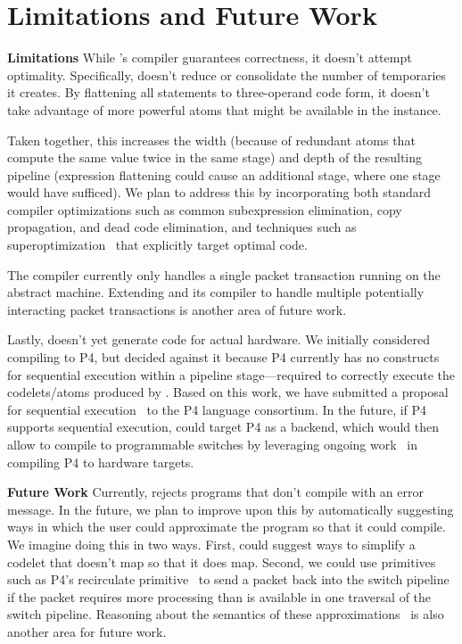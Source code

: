 \section{Limitations and Future Work}
\label{s:limitations}

\textbf{Limitations}
While \pktlanguage's compiler guarantees correctness, it doesn't attempt
optimality.  Specifically, \pktlanguage doesn't reduce or consolidate the
number of temporaries it creates. By flattening all statements to three-operand
code form, it doesn't take advantage of more powerful atoms that might be
available in the \absmachine instance.

Taken together, this increases the width (because of redundant atoms that
compute the same value twice in the same stage) and depth of the resulting
pipeline (expression flattening could cause an additional stage, where one
stage would have sufficed). We plan to address this by incorporating both
standard compiler optimizations such as common subexpression elimination, copy
propagation, and dead code elimination, and techniques such as
superoptimization~\cite{stoke, superoptimizer} that explicitly target optimal
code.

The \pktlanguage compiler currently only handles a single packet transaction
running on the abstract machine.  Extending \pktlanguage and its compiler to
handle multiple potentially interacting packet transactions is another area of
future work.

Lastly, \pktlanguage doesn't yet generate code for actual hardware. We
initially considered compiling \pktlanguage to P4, but decided against it
because P4 currently has no constructs for sequential execution within a
pipeline stage---required to correctly execute the codelets/atoms produced by
\pktlanguage. Based on this work, we have submitted a proposal for sequential
execution~\cite{p4-semantics} to the P4 language consortium. In the future, if
P4 supports sequential execution, \pktlanguage could target P4 as a backend,
which would then allow \pktlanguage to compile to programmable switches by
leveraging ongoing work~\cite{netronome, xilinx,lavanya_compiler} in compiling
P4 to hardware targets.

\textbf{Future Work}
Currently, \pktlanguage rejects programs that don't compile with an error
message.  In the future, we plan to improve upon this by automatically
suggesting ways in which the user could approximate the program so that it
could compile. We imagine doing this in two ways. First, \pktlanguage could
suggest ways to simplify a codelet that doesn't map so that it does map.
Second, we could use primitives such as P4's recirculate
primitive~\cite{p4spec} to send a packet back into the switch pipeline if the
packet requires more processing than is available in one traversal of the
switch pipeline. Reasoning about the semantics of these
approximations~\cite{sampsonApprox, chisel} is also another area for future
work.

